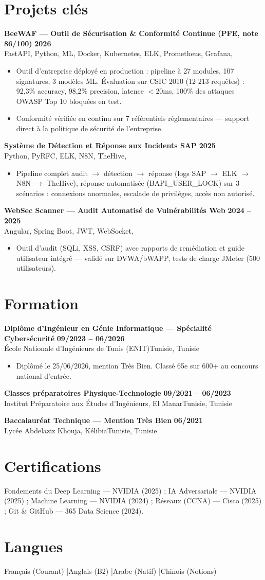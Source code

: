 \documentclass[a4paper,9pt]{article}
\newcommand{\cventry}[4]{\textbf{#1} \hfill \textbf{#4}\\[0.2pt]#2{\ifx\relax#3\relax\else, #3\fi}\par\vspace{0.3pt}}
\begin{document}
\section{Projets clés}
\cventry{BeeWAF --- Outil de Sécurisation \& Conformité Continue (PFE, note 86/100)}{FastAPI, Python, ML, Docker, Kubernetes, ELK, Prometheus, Grafana}{}{2026}
\begin{itemize}
  \item Outil d'entreprise déployé en production : pipeline à 27 modules, 107 signatures, 3 modèles ML. Évaluation sur CSIC 2010 (12 213 requêtes) : 92,3\% accuracy, 98,2\% precision, latence $<$20ms, 100\% des attaques OWASP Top 10 bloquées en test.
  \item Conformité vérifiée en continu sur 7 référentiels réglementaires --- support direct à la politique de sécurité de l'entreprise.
\end{itemize}
\cventry{Système de Détection et Réponse aux Incidents SAP}{Python, PyRFC, ELK, N8N, TheHive}{}{2025}
\begin{itemize}
  \item Pipeline complet audit $\rightarrow$ détection $\rightarrow$ réponse (logs SAP $\rightarrow$ ELK $\rightarrow$ N8N $\rightarrow$ TheHive), réponse automatisée (BAPI\_USER\_LOCK) sur 3 scénarios : connexions anormales, escalade de privilèges, accès non autorisé.
\end{itemize}
\cventry{WebSec Scanner --- Audit Automatisé de Vulnérabilités Web}{Angular, Spring Boot, JWT, WebSocket}{}{2024 -- 2025}
\begin{itemize}
  \item Outil d'audit (SQLi, XSS, CSRF) avec rapports de remédiation et guide utilisateur intégré --- validé sur DVWA/bWAPP, tests de charge JMeter (500 utilisateurs).
\end{itemize}
\section{Formation}
\cventry{Diplôme d'Ingénieur en Génie Informatique --- Spécialité Cybersécurité}{École Nationale d'Ingénieurs de Tunis (ENIT)}{Tunisie}{09/2023 -- 06/2026}
\begin{itemize}
  \item Diplômé le 25/06/2026, mention Très Bien. Classé 65e sur 600+ au concours national d'entrée.
\end{itemize}
\cventry{Classes préparatoires Physique-Technologie}{Institut Préparatoire aux Études d'Ingénieurs, El Manar}{Tunisie}{09/2021 -- 06/2023}
\cventry{Baccalauréat Technique --- Mention Très Bien}{Lycée Abdelaziz Khouja, Kélibia}{Tunisie}{06/2021}
\section{Certifications}
Fondements du Deep Learning --- NVIDIA (2025) ; IA Adversariale --- NVIDIA (2025) ; Machine Learning --- NVIDIA (2024) ; Réseaux (CCNA) --- Cisco (2025) ; Git \& GitHub --- 365 Data Science (2024).
\section{Langues}
Français (Courant) \quad|\quad Anglais (B2) \quad|\quad Arabe (Natif) \quad|\quad Chinois (Notions)
\end{document}
